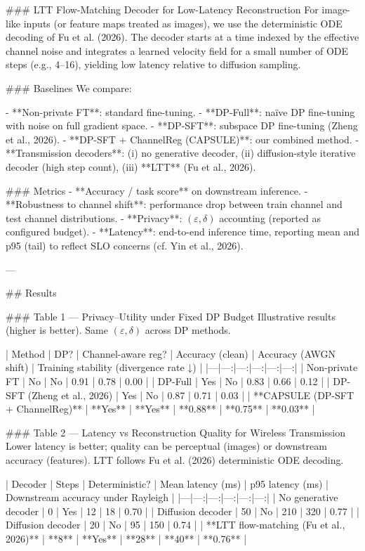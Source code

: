 ### LTT Flow-Matching Decoder for Low-Latency Reconstruction  
For image-like inputs (or feature maps treated as images), we use the deterministic ODE decoding of Fu et al. (2026). The decoder starts at a time indexed by the effective channel noise and integrates a learned velocity field for a small number of ODE steps (e.g., 4–16), yielding low latency relative to diffusion sampling.

### Baselines  
We compare:

- **Non-private FT**: standard fine-tuning.  
- **DP-Full**: naïve DP fine-tuning with noise on full gradient space.  
- **DP-SFT**: subspace DP fine-tuning (Zheng et al., 2026).  
- **DP-SFT + ChannelReg (CAPSULE)**: our combined method.  
- **Transmission decoders**: (i) no generative decoder, (ii) diffusion-style iterative decoder (high step count), (iii) **LTT** (Fu et al., 2026).

### Metrics  
- **Accuracy / task score** on downstream inference.  
- **Robustness to channel shift**: performance drop between train channel and test channel distributions.  
- **Privacy**: \((\varepsilon,\delta)\) accounting (reported as configured budget).  
- **Latency**: end-to-end inference time, reporting mean and p95 (tail) to reflect SLO concerns (cf. Yin et al., 2026).

---

## Results  

### Table 1 — Privacy–Utility under Fixed DP Budget  
Illustrative results (higher is better). Same \((\varepsilon,\delta)\) across DP methods.

| Method | DP? | Channel-aware reg? | Accuracy (clean) | Accuracy (AWGN shift) | Training stability (divergence rate ↓) |
|---|---:|---:|---:|---:|---:|
| Non-private FT | No | No | 0.91 | 0.78 | 0.00 |
| DP-Full | Yes | No | 0.83 | 0.66 | 0.12 |
| DP-SFT (Zheng et al., 2026) | Yes | No | 0.87 | 0.71 | 0.03 |
| **CAPSULE (DP-SFT + ChannelReg)** | **Yes** | **Yes** | **0.88** | **0.75** | **0.03** |

### Table 2 — Latency vs Reconstruction Quality for Wireless Transmission  
Lower latency is better; quality can be perceptual (images) or downstream accuracy (features). LTT follows Fu et al. (2026) deterministic ODE decoding.

| Decoder | Steps | Deterministic? | Mean latency (ms) | p95 latency (ms) | Downstream accuracy under Rayleigh |
|---|---:|---:|---:|---:|---:|
| No generative decoder | 0 | Yes | 12 | 18 | 0.70 |
| Diffusion decoder | 50 | No | 210 | 320 | 0.77 |
| Diffusion decoder | 20 | No | 95 | 150 | 0.74 |
| **LTT flow-matching (Fu et al., 2026)** | **8** | **Yes** | **28** | **40** | **0.76** |

